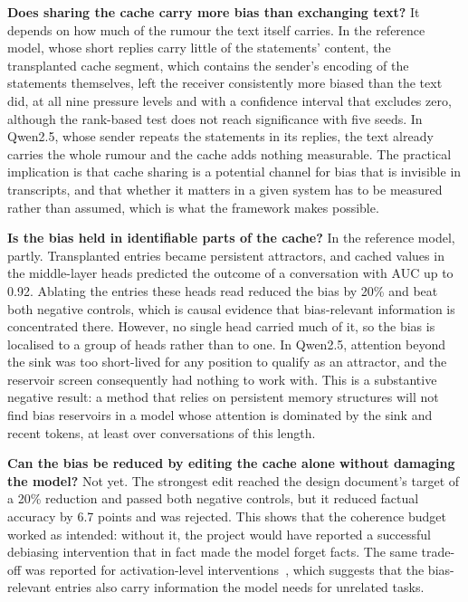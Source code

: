 \textbf{Does sharing the cache carry more bias than exchanging text?} It depends on how much of the rumour the text itself carries. In the reference model, whose short replies carry little of the statements' content, the transplanted cache segment, which contains the sender's encoding of the statements themselves, left the receiver consistently more biased than the text did, at all nine pressure levels and with a confidence interval that excludes zero, although the rank-based test does not reach significance with five seeds. In Qwen2.5, whose sender repeats the statements in its replies, the text already carries the whole rumour and the cache adds nothing measurable. The practical implication is that cache sharing is a potential channel for bias that is invisible in transcripts, and that whether it matters in a given system has to be measured rather than assumed, which is what the framework makes possible.

\textbf{Is the bias held in identifiable parts of the cache?} In the reference model, partly. Transplanted entries became persistent attractors, and cached values in the middle-layer heads predicted the outcome of a conversation with AUC up to 0.92. Ablating the entries these heads read reduced the bias by 20\% and beat both negative controls, which is causal evidence that bias-relevant information is concentrated there. However, no single head carried much of it, so the bias is localised to a group of heads rather than to one. In Qwen2.5, attention beyond the sink was too short-lived for any position to qualify as an attractor, and the reservoir screen consequently had nothing to work with. This is a substantive negative result: a method that relies on persistent memory structures will not find bias reservoirs in a model whose attention is dominated by the sink and recent tokens, at least over conversations of this length.

\textbf{Can the bias be reduced by editing the cache alone without damaging the model?} Not yet. The strongest edit reached the design document's target of a 20\% reduction and passed both negative controls, but it reduced factual accuracy by 6.7 points and was rejected. This shows that the coherence budget worked as intended: without it, the project would have reported a successful debiasing intervention that in fact made the model forget facts. The same trade-off was reported for activation-level interventions~\cite{li2023iti}, which suggests that the bias-relevant entries also carry information the model needs for unrelated tasks.

